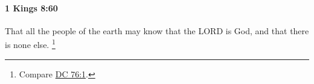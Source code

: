 
		\paragraph{1 Kings 8:60} %
			\label{1KINGS-8-60}

			That all the people of the earth may know that the LORD is God, and that there is none else.%
				\footnote{%
					\label{1KINGS-8-60-else}%
					Compare \hyperref[DC76-1]{DC 76:1}.
					}


